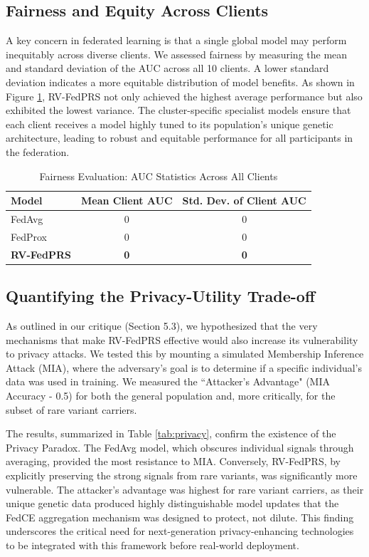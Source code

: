 \documentclass[conference]{IEEEtran}
\begin{document}
\subsection{Fairness and Equity Across Clients}

A key concern in federated learning is that a single global model may perform inequitably across diverse clients. We assessed fairness by measuring the mean and standard deviation of the AUC across all 10 clients. A lower standard deviation indicates a more equitable distribution of model benefits. As shown in Figure \ref{fig:fairness}, RV-FedPRS not only achieved the highest average performance but also exhibited the lowest variance. The cluster-specific specialist models ensure that each client receives a model highly tuned to its population's unique genetic architecture, leading to robust and equitable performance for all participants in the federation.

\begin{table}[h!]
\centering
\caption{Fairness Evaluation: AUC Statistics Across All Clients}
\label{fig:fairness}
\begin{tabular}{lcc}
\hline
\textbf{Model} & \textbf{Mean Client AUC} & \textbf{Std. Dev. of Client AUC} \\ \hline
FedAvg & 0 & 0 \\
FedProx & 0 & 0 \\
\textbf{RV-FedPRS} & \textbf{0} & \textbf{0} \\ \hline
\end{tabular}
\end{table}

\subsection{Quantifying the Privacy-Utility Trade-off}

As outlined in our critique (Section 5.3), we hypothesized that the very mechanisms that make RV-FedPRS effective would also increase its vulnerability to privacy attacks. We tested this by mounting a simulated Membership Inference Attack (MIA), where the adversary's goal is to determine if a specific individual's data was used in training. We measured the ``Attacker's Advantage" (MIA Accuracy - 0.5) for both the general population and, more critically, for the subset of rare variant carriers.

The results, summarized in Table \ref{tab:privacy}, confirm the existence of the Privacy Paradox. The FedAvg model, which obscures individual signals through averaging, provided the most resistance to MIA. Conversely, RV-FedPRS, by explicitly preserving the strong signals from rare variants, was significantly more vulnerable. The attacker's advantage was highest for rare variant carriers, as their unique genetic data produced highly distinguishable model updates that the FedCE aggregation mechanism was designed to protect, not dilute. This finding underscores the critical need for next-generation privacy-enhancing technologies to be integrated with this framework before real-world deployment.
\end{document}
